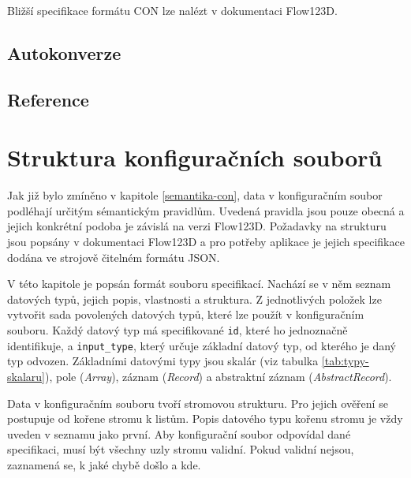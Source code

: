 \documentclass[FM,MP]{tulthesis}
\begin{document}
	Bližší specifikace formátu CON lze nalézt v dokumentaci Flow123D. %

	\section{Autokonverze}

	\section{Reference}

\chapter{Struktura konfiguračních souborů}
	Jak již bylo zmíněno v kapitole \ref{semantika-con}, data v konfiguračním soubor podléhají určitým sémantickým pravidlům. Uvedená pravidla jsou pouze obecná a jejich konkrétní podoba je závislá na verzi Flow123D. Požadavky na strukturu jsou popsány v dokumentaci Flow123D a pro potřeby aplikace je jejich specifikace dodána ve strojově čitelném formátu JSON.

	V této kapitole je popsán formát souboru specifikací. Nachází se v něm seznam datových typů, jejich popis, vlastnosti a struktura. Z jednotlivých položek lze vytvořit sada povolených datových typů, které lze použít v konfiguračním souboru. Každý datový typ má specifikované \texttt{id}, které ho jednoznačně identifikuje, a \texttt{input\_type}, který určuje základní datový typ, od kterého je daný typ odvozen. Základními datovými typy jsou skalár (viz tabulka \ref{tab:typy-skalaru}), pole (\textit{Array}), záznam (\textit{Record}) a abstraktní záznam (\textit{AbstractRecord}).

	Data v konfiguračním souboru tvoří stromovou strukturu. Pro jejich ověření se postupuje od kořene stromu k listům. Popis datového typu kořenu stromu je vždy uveden v seznamu jako první. Aby konfigurační soubor odpovídal dané specifikaci, musí být všechny uzly stromu validní. Pokud validní nejsou, zaznamená se, k jaké chybě došlo a kde.

\end{document}
